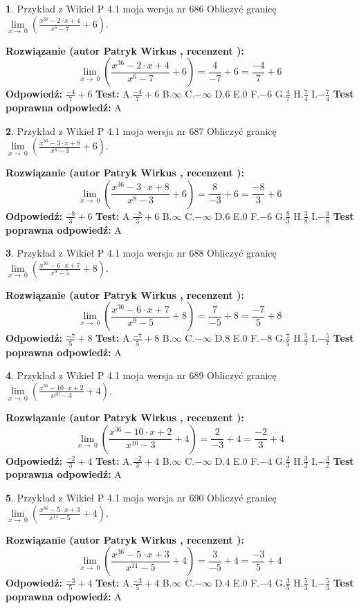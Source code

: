 \documentclass[12pt, a4paper]{article}
\theoremstyle{definition} %
\newtheorem{zad}{}
\newcommand{\zadStart}[1]{\begin{zad}#1\newline}
\newcommand{\zadStop}{\end{zad}}
\newcommand{\rozwStart}[2]{\noindent \textbf{Rozwiązanie (autor #1 , recenzent #2): }\newline}
\newcommand{\rozwStop}{\newline}
\newcommand{\odpStart}{\noindent \textbf{Odpowiedź:}\newline}
\newcommand{\odpStop}{\newline}
\newcommand{\testStart}{\noindent \textbf{Test:}\newline}
\newcommand{\testStop}{\newline}
\newcommand{\kluczStart}{\noindent \textbf{Test poprawna odpowiedź:}\newline}
\newcommand{\kluczStop}{\newline}
\begin{document}
\zadStart{Przykład z Wikieł P 4.1 moja wersja nr 686}
Obliczyć granicę $\lim\limits_{x\to\ 0}(\frac{x^{36}-2 \cdot x +4}{x^{6}-7}+6)$.
\zadStop
\rozwStart{Patryk Wirkus}{}
$$\lim\limits_{x\to\ 0}(\frac{x^{36}-2 \cdot x +4}{x^{6}-7}+6)=\frac{4}{-7}+6=\frac{-4}{7}+6$$
\rozwStop
\odpStart
$\frac{-4}{7}+6$
\odpStop
\testStart
A.$\frac{-4}{7}+6$
B.$\infty$
C.$-\infty$
D.$6$
E.$0$
F.$-6$
G.$\frac{4}{7}$
H.$\frac{7}{4}$
I.$-\frac{7}{4}$
\testStop
\kluczStart
A
\kluczStop



\zadStart{Przykład z Wikieł P 4.1 moja wersja nr 687}
Obliczyć granicę $\lim\limits_{x\to\ 0}(\frac{x^{36}-3 \cdot x +8}{x^{8}-3}+6)$.
\zadStop
\rozwStart{Patryk Wirkus}{}
$$\lim\limits_{x\to\ 0}(\frac{x^{36}-3 \cdot x +8}{x^{8}-3}+6)=\frac{8}{-3}+6=\frac{-8}{3}+6$$
\rozwStop
\odpStart
$\frac{-8}{3}+6$
\odpStop
\testStart
A.$\frac{-8}{3}+6$
B.$\infty$
C.$-\infty$
D.$6$
E.$0$
F.$-6$
G.$\frac{8}{3}$
H.$\frac{3}{8}$
I.$-\frac{3}{8}$
\testStop
\kluczStart
A
\kluczStop



\zadStart{Przykład z Wikieł P 4.1 moja wersja nr 688}
Obliczyć granicę $\lim\limits_{x\to\ 0}(\frac{x^{36}-6 \cdot x +7}{x^{9}-5}+8)$.
\zadStop
\rozwStart{Patryk Wirkus}{}
$$\lim\limits_{x\to\ 0}(\frac{x^{36}-6 \cdot x +7}{x^{9}-5}+8)=\frac{7}{-5}+8=\frac{-7}{5}+8$$
\rozwStop
\odpStart
$\frac{-7}{5}+8$
\odpStop
\testStart
A.$\frac{-7}{5}+8$
B.$\infty$
C.$-\infty$
D.$8$
E.$0$
F.$-8$
G.$\frac{7}{5}$
H.$\frac{5}{7}$
I.$-\frac{5}{7}$
\testStop
\kluczStart
A
\kluczStop



\zadStart{Przykład z Wikieł P 4.1 moja wersja nr 689}
Obliczyć granicę $\lim\limits_{x\to\ 0}(\frac{x^{36}-10 \cdot x +2}{x^{10}-3}+4)$.
\zadStop
\rozwStart{Patryk Wirkus}{}
$$\lim\limits_{x\to\ 0}(\frac{x^{36}-10 \cdot x +2}{x^{10}-3}+4)=\frac{2}{-3}+4=\frac{-2}{3}+4$$
\rozwStop
\odpStart
$\frac{-2}{3}+4$
\odpStop
\testStart
A.$\frac{-2}{3}+4$
B.$\infty$
C.$-\infty$
D.$4$
E.$0$
F.$-4$
G.$\frac{2}{3}$
H.$\frac{3}{2}$
I.$-\frac{3}{2}$
\testStop
\kluczStart
A
\kluczStop



\zadStart{Przykład z Wikieł P 4.1 moja wersja nr 690}
Obliczyć granicę $\lim\limits_{x\to\ 0}(\frac{x^{36}-5 \cdot x +3}{x^{11}-5}+4)$.
\zadStop
\rozwStart{Patryk Wirkus}{}
$$\lim\limits_{x\to\ 0}(\frac{x^{36}-5 \cdot x +3}{x^{11}-5}+4)=\frac{3}{-5}+4=\frac{-3}{5}+4$$
\rozwStop
\odpStart
$\frac{-3}{5}+4$
\odpStop
\testStart
A.$\frac{-3}{5}+4$
B.$\infty$
C.$-\infty$
D.$4$
E.$0$
F.$-4$
G.$\frac{3}{5}$
H.$\frac{5}{3}$
I.$-\frac{5}{3}$
\testStop
\kluczStart
A
\kluczStop
\end{document}
